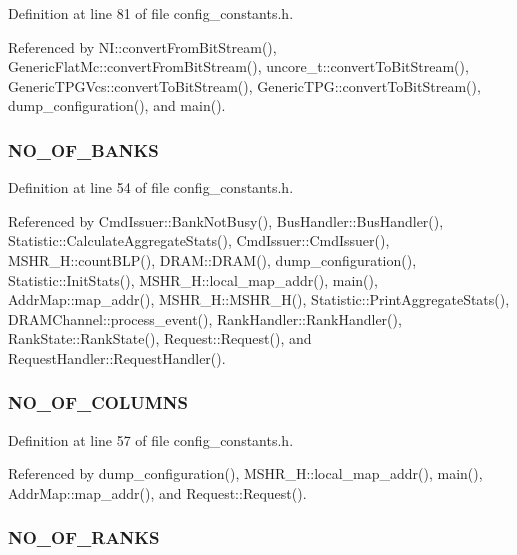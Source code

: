 Definition at line 81 of file config\_\-constants.h.

Referenced by NI::convertFromBitStream(), GenericFlatMc::convertFromBitStream(), uncore\_\-t::convertToBitStream(), GenericTPGVcs::convertToBitStream(), GenericTPG::convertToBitStream(), dump\_\-configuration(), and main().
\subsubsection[{NO\_\-OF\_\-BANKS}]{ {\bf NO\_\-OF\_\-BANKS}}\label{mc__constants_8h_a9a8bc812122b9b1129824fdea80e872}




Definition at line 54 of file config\_\-constants.h.

Referenced by CmdIssuer::BankNotBusy(), BusHandler::BusHandler(), Statistic::CalculateAggregateStats(), CmdIssuer::CmdIssuer(), MSHR\_\-H::countBLP(), DRAM::DRAM(), dump\_\-configuration(), Statistic::InitStats(), MSHR\_\-H::local\_\-map\_\-addr(), main(), AddrMap::map\_\-addr(), MSHR\_\-H::MSHR\_\-H(), Statistic::PrintAggregateStats(), DRAMChannel::process\_\-event(), RankHandler::RankHandler(), RankState::RankState(), Request::Request(), and RequestHandler::RequestHandler().
\subsubsection[{NO\_\-OF\_\-COLUMNS}]{ {\bf NO\_\-OF\_\-COLUMNS}}\label{mc__constants_8h_ffc6bbc04b2973cf564f70f37103a946}




Definition at line 57 of file config\_\-constants.h.

Referenced by dump\_\-configuration(), MSHR\_\-H::local\_\-map\_\-addr(), main(), AddrMap::map\_\-addr(), and Request::Request().
\subsubsection[{NO\_\-OF\_\-RANKS}]{ {\bf NO\_\-OF\_\-RANKS}}\label{mc__constants_8h_e1acef1609deca0291eaf30593109d17}




